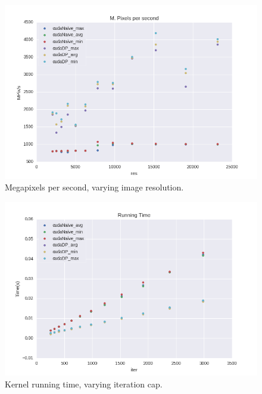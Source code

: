 \documentclass[letterpaper]{article}
\begin{document}
\begin{multicols}{2}
\begin{figure}[H]
  \includegraphics[width=\linewidth]{experiments3/mpps_graph_exp_res.png}
  \caption{Megapixels per second, varying image resolution.}
\end{figure}

\begin{figure}[H]
  \includegraphics[width=\linewidth]{experiments3/running_time_graph_exp_iter.png}
  \caption{Kernel running time, varying iteration cap.}
\end{figure}


\end{multicols}
\end{document}
